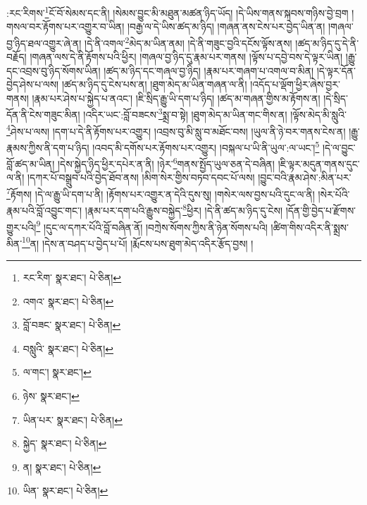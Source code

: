 :རང་རིགས་\footnote{རང་རིག་  སྣར་ཐང་།  པེ་ཅིན། }ངོ་བོ་སེམས་དང་ནི། །སེམས་བྱུང་མི་མཐུན་མཚན་ཉིད་ཡོད། །དེ་ཡིས་གནས་སྐབས་གཉིས་བྱེ་བྲག །གསལ་བར་རྟོགས་པར་འགྱུར་བ་ཡིན། །བརྒྱ་ལ་དེ་ཡིས་ཚད་མ་ཉིད། །གཞན་ནས་ངེས་པར་བྱེད་ཡིན་ན། །གཞལ་བྱ་ཉིད་ཐལ་འགྱུར་ཞེ་ན། །དེ་ནི་འགལ་\footnote{འགའ་  སྣར་ཐང་།  པེ་ཅིན། }མེད་མ་ཡིན་ནམ། །དེ་ནི་གཟུང་བྱའི་དངོས་ལྟོས་ནས། །ཚད་མ་ཉིད་དུ་དེ་ནི་བརྗོད། །གཞན་ལས་དེ་ནི་རྟོགས་པའི་ཕྱིར། །གཞལ་བྱ་ཉིད་དུ་རྣམ་པར་གནས། །ལྟོས་པ་དབྱེ་བས་དེ་ལྟར་ཡིན། །རྒྱུ་དང་འབྲས་བུ་ཉིད་སོགས་ཡིན། །ཚད་མ་ཉིད་དང་གཞལ་བྱ་ཉིད། །རྣམ་པར་གཞག་པ་འགལ་བ་མིན། །དེ་ལྟར་དོན་བྱེད་ཤེས་པ་ལས། །ཚད་མ་ཉིད་དུ་ངེས་པས་ན། །ཐུག་མེད་མ་ཡིན་གཞན་ལ་ནི། །འདོད་པ་ལྡོག་ཕྱིར་ཞེས་བྱར་གནས། །རྣམ་པར་ཤེས་པ་སྐྱེད་པ་ནའང་། །ཇི་སྲིད་རྒྱུ་ཡི་དག་པ་ཉིད། །ཚད་མ་གཞན་གྱིས་མ་རྟོགས་ན། །དེ་སྲིད་དོན་ནི་ངེས་གཟུང་མིན། །འདིར་ཡང་:བློ་བཟངས་\footnote{བློ་བཟང་  སྣར་ཐང་།  པེ་ཅིན། }སྨྲ་བ་སྟེ། །ཐུག་མེད་མ་ཡིན་གང་གིས་ན། །ལྟོས་མེད་མི་སླུའི་\footnote{བསླུའི་  སྣར་ཐང་།  པེ་ཅིན། }ཤེས་པ་ལས། །དག་པ་དེ་ནི་རྟོགས་པར་འགྱུར། །འབྲས་བུ་མི་སླུ་བ་མཐོང་བས། །ཡུལ་ནི་ཉེ་བར་གནས་ངེས་ན། །རྒྱུ་རྣམས་ཀྱིས་ནི་དག་པ་ཉིད། །འབད་མི་དགོས་པར་རྟོགས་པར་འགྱུར། །བསྐལ་པ་ཡི་ནི་ཡུལ་:ལ་ཡང་།\footnote{ལ་གང་།  སྣར་ཐང་། } །དེ་ལ་བྱུང་བློ་ཚད་མ་ཡིན། །དེས་སྐྱེད་ཉིད་ཕྱིར་དཔེར་ན་ནི། །ཉེར་\footnote{ཉེས་  སྣར་ཐང་། }གནས་སྤྱོད་ཡུལ་ཅན་དེ་བཞིན། །ཇི་ལྟར་མདུན་གནས་དུང་ལ་ནི། །དཀར་པོ་བསྒྲུབ་པའི་བྱེད་ཐོབ་ནས། །མིག་སེར་གྱིས་བཏབ་དབང་པོ་ལས། །བྱུང་བའི་རྣམ་ཤེས་:མིན་པར་\footnote{ཡིན་པར་  སྣར་ཐང་།  པེ་ཅིན། }རྟོགས། །དེ་ལ་རྒྱུ་ཡི་དག་པ་ནི། །རྟོགས་པར་འགྱུར་ན་དེའི་དུས་སུ། །གསེར་ལས་བྱས་པའི་དུང་ལ་ནི། །སེར་པོའི་རྣམ་པའི་བློ་འབྱུང་གང་། །རྣམ་པར་དག་པའི་རྒྱུས་བསྐྱེད་\footnote{སྐྱེད་  སྣར་ཐང་།  པེ་ཅིན། }ཕྱིར། །དེ་ནི་ཚད་མ་ཉིད་དུ་ངེས། །དོན་གྱི་བྱེད་པ་རྫོགས་གྱུར་པའི།\footnote{ན།  སྣར་ཐང་།  པེ་ཅིན། } །དུང་ལ་དཀར་པོའི་བློ་བཞིན་ནོ། །བཀྲེས་སོགས་ཀྱིས་ནི་ཉེན་སོགས་པའི། །ཚིག་གིས་འདིར་ནི་སྨྲས་མིན་\footnote{ཡིན་  སྣར་ཐང་།  པེ་ཅིན། }ན། །དེས་ན་བཤད་པ་བྱེད་པ་པོ། །རྨོངས་པས་ཐུག་མེད་འདིར་རྩོད་བྱས། །
